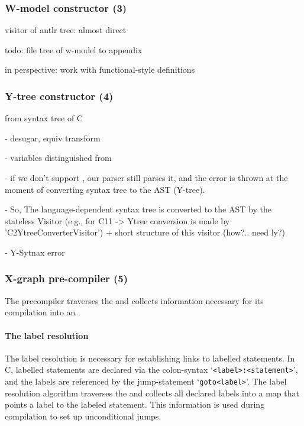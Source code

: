 

\subsubsection{W-model constructor (3)}
\label{ch:impl:proc:w-constr}


visitor of antlr tree: almost direct

todo: file tree of w-model to appendix

in perspective: work with functional-style definitions


\subsubsection{Y-tree constructor (4)}
\label{ch:impl:proc:y-constr}

from  syntax tree of C

- desugar, equiv transform

- variables distinguished from 

- if we don't support , our parser still parses it, and the error is thrown at the moment of converting syntax tree to the AST (Y-tree).

- So, The language-dependent syntax tree is converted to the AST by the stateless Visitor (e.g., for C11 -> Ytree conversion is made by 'C2YtreeConverterVisitor') + short structure of this visitor (how?.. need ly?)

- Y-Sytnax error

\subsubsection{X-graph pre-compiler (5)}
\label{ch:impl:proc:x-pre-compiler}

The precompiler traverses the \ytree{} and collects information necessary for its compilation into an \xgraph{}.



\paragraph{The label resolution}
\label{ch:impl:proc:x-pre-compiler:label}


The label resolution is necessary for establishing links to labelled statements. %
In C, labelled statements are declared via the colon-syntax `\texttt{<label>\;:\;<statement>}', and the labels are referenced by the jump-statement `\texttt{goto\;<label>}'.
The label resolution algorithm traverses the \ytree{} and collects all declared labels into a map that points a label to the labeled statement. %
This information is used during compilation to set up unconditional jumps.


